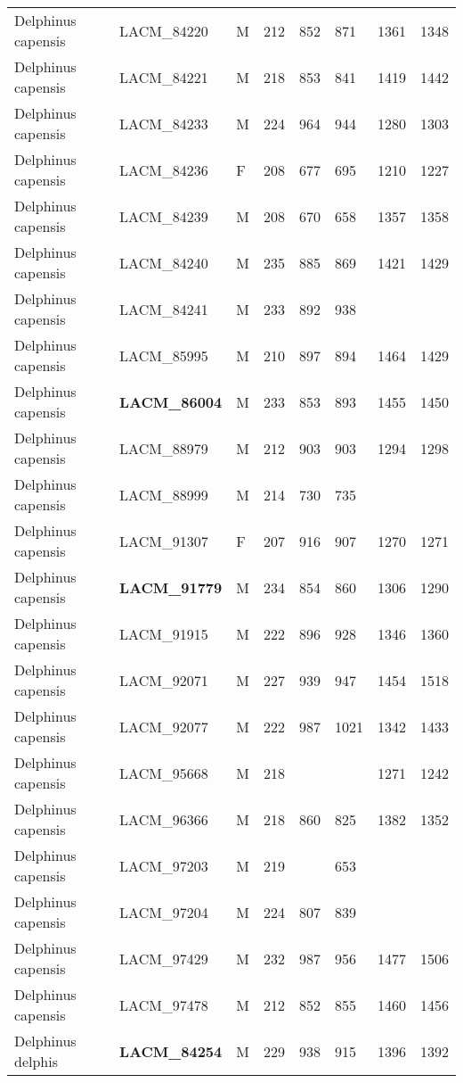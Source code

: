 \begin{longtable}{|p{1in}p{1in}p{.15in}p{.4in}p{.4in}p{.5in}p{.5in}p{.75in}|}
  Delphinus capensis & LACM\_84220 & M & 212 & 852 & 871 & 1361 & 1348 \\ 
  Delphinus capensis & LACM\_84221 & M & 218 & 853 & 841 & 1419 & 1442 \\ 
  Delphinus capensis & LACM\_84233 & M & 224 & 964 & 944 & 1280 & 1303 \\ 
  Delphinus capensis & LACM\_84236 & F & 208 & 677 & 695 & 1210 & 1227 \\ 
  Delphinus capensis & LACM\_84239 & M & 208 & 670 & 658 & 1357 & 1358 \\ 
  Delphinus capensis & LACM\_84240 & M & 235 & 885 & 869 & 1421 & 1429 \\ 
  Delphinus capensis & LACM\_84241 & M & 233 & 892 & 938 &  &  \\ 
  Delphinus capensis & LACM\_85995 & M & 210 & 897 & 894 & 1464 & 1429 \\ 
  Delphinus capensis & \textbf{ LACM\_86004 } & M & 233 & 853 & 893 & 1455 & 1450 \\ 
  Delphinus capensis & LACM\_88979 & M & 212 & 903 & 903 & 1294 & 1298 \\ 
  Delphinus capensis & LACM\_88999 & M & 214 & 730 & 735 &  &  \\ 
  Delphinus capensis & LACM\_91307 & F & 207 & 916 & 907 & 1270 & 1271 \\ 
  Delphinus capensis & \textbf{ LACM\_91779 } & M & 234 & 854 & 860 & 1306 & 1290 \\ 
  Delphinus capensis & LACM\_91915 & M & 222 & 896 & 928 & 1346 & 1360 \\ 
  Delphinus capensis & LACM\_92071 & M & 227 & 939 & 947 & 1454 & 1518 \\ 
  Delphinus capensis & LACM\_92077 & M & 222 & 987 & 1021 & 1342 & 1433 \\ 
  Delphinus capensis & LACM\_95668 & M & 218 &  &  & 1271 & 1242 \\ 
  Delphinus capensis & LACM\_96366 & M & 218 & 860 & 825 & 1382 & 1352 \\ 
  Delphinus capensis & LACM\_97203 & M & 219 &  & 653 &  &  \\ 
  Delphinus capensis & LACM\_97204 & M & 224 & 807 & 839 &  &  \\ 
  Delphinus capensis & LACM\_97429 & M & 232 & 987 & 956 & 1477 & 1506 \\ 
  Delphinus capensis & LACM\_97478 & M & 212 & 852 & 855 & 1460 & 1456 \\ 
  Delphinus delphis & \textbf{ LACM\_84254 } & M & 229 & 938 & 915 & 1396 & 1392 \\ 

\end{longtable}
